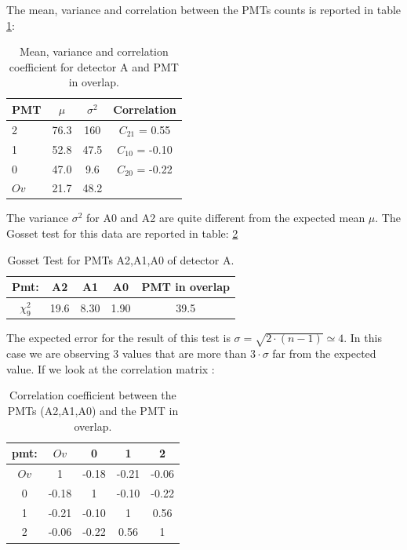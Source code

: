 The mean, variance and correlation between the PMTs counts is reported in table \ref{tab:ResultAA}:

\begin{table}[!ht]
\centering
\begin{tabular}{lccc}
\hline 
PMT & $\mu$ & $\sigma^{2}$ & Correlation \\
\hline
2 	& 76.3	& 160	& $C_{21}$ = 0.55 \\
1 	& 52.8	& 47.5	& $C_{10}$ = -0.10 \\
0	& 47.0	& 9.6   & $C_{20}$ = -0.22 \\
\hline
$Ov$ & 21.7 & 48.2 & \\
\hline
\end{tabular}
\caption{Mean, variance and correlation coefficient for detector A and PMT in overlap.}
\label{tab:ResultAA}
\end{table}


The variance $\sigma^{2}$ for A0 and A2 are quite different from the expected mean $\mu$. The Gosset test for this data are reported in table: \ref{tab:GossetA0A1A2} 

\begingroup
\setlength{\tabcolsep}{8pt} %
\renewcommand{\arraystretch}{1.2} %
\begin{table}[!ht]
\centering
\begin{tabular}{c|cccc}
\hline 
Pmt: & A2 & A1 & A0 & PMT in overlap \\ 
\hline
$\chi^{2}_{9}$ & 19.6 & 8.30 & 1.90 & 39.5\\ 
\hline
\end{tabular} 
\caption{Gosset Test for PMTs A2,A1,A0 of detector A.}
\label{tab:GossetA0A1A2}
\end{table}
\endgroup
\smallskip

The expected error for the result of this test is $\sigma = \sqrt{2 \cdot (n-1)} \simeq 4$. In this case we are observing 3 values that are more than  $3 \cdot \sigma$ far from the expected value. If we look at the correlation matrix :

\begin{table}[!ht]
\centering
\begin{tabular}{ccccc}
\hline 
pmt: & $Ov$ & 0 & 1 & 2 \\ 
\hline 
$Ov$ & 1 & -0.18  & -0.21  & -0.06  \\ 
0 	 & -0.18  & 1 & -0.10  & -0.22  \\ 
1    & -0.21  & -0.10  & 1 & 0.56  \\ 
2    & -0.06 & -0.22  & 0.56  & 1 \\ 
\hline 
\end{tabular}
\caption{Correlation coefficient between the PMTs (A2,A1,A0) and the PMT in overlap.}
\end{table}

